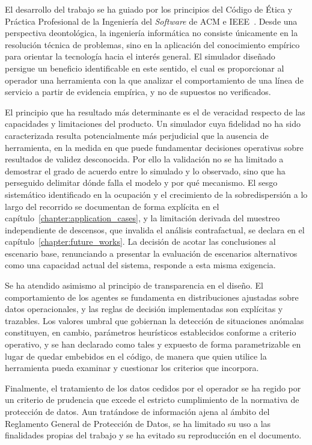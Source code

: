 El desarrollo del trabajo se ha guiado por los principios del Código de Ética y Práctica
Profesional de la Ingeniería del \textit{Software} de ACM e IEEE~\cite{acm_ieee_ethics}.
Desde una perspectiva deontológica, la ingeniería informática no consiste únicamente en la
resolución técnica de problemas, sino en la aplicación del conocimiento empírico para
orientar la tecnología hacia el interés general. El simulador diseñado persigue un beneficio
identificable en este sentido, el cual es proporcionar al operador una herramienta con la que analizar
el comportamiento de una línea de servicio a partir de evidencia empírica, y no de supuestos
no verificados.

El principio que ha resultado más determinante es el de veracidad respecto de las capacidades
y limitaciones del producto. Un simulador cuya fidelidad no ha sido caracterizada resulta
potencialmente más perjudicial que la ausencia de herramienta, en la medida en que puede
fundamentar decisiones operativas sobre resultados de validez desconocida. Por ello la
validación no se ha limitado a demostrar el grado de acuerdo entre lo simulado y lo
observado, sino que ha perseguido delimitar dónde falla el modelo y por qué mecanismo. El
sesgo sistemático identificado en la ocupación y el crecimiento de la sobredispersión a lo
largo del recorrido se documentan de forma explícita en el
capítulo~\ref{chapter:application_cases}, y la limitación derivada del muestreo independiente de
descensos, que invalida el análisis contrafactual, se declara en el
capítulo~\ref{chapter:future_works}. La decisión de acotar las conclusiones al escenario
base, renunciando a presentar la evaluación de escenarios alternativos como una capacidad
actual del sistema, responde a esta misma exigencia.

Se ha atendido asimismo al principio de transparencia en el diseño. El comportamiento de los
agentes se fundamenta en distribuciones ajustadas sobre datos operacionales, y las reglas de
decisión implementadas son explícitas y trazables. Los valores umbral que gobiernan la
detección de situaciones anómalas constituyen, en cambio, parámetros heurísticos establecidos
conforme a criterio operativo, y se han declarado como tales y expuesto de forma
parametrizable en lugar de quedar embebidos en el código, de manera que quien utilice la
herramienta pueda examinar y cuestionar los criterios que incorpora.

Finalmente, el tratamiento de los datos cedidos por el operador se ha regido por un criterio
de prudencia que excede el estricto cumplimiento de la normativa de protección de datos. Aun
tratándose de información ajena al ámbito del Reglamento General de Protección de Datos, se
ha limitado su uso a las finalidades propias del trabajo y se ha evitado su reproducción en
el documento.